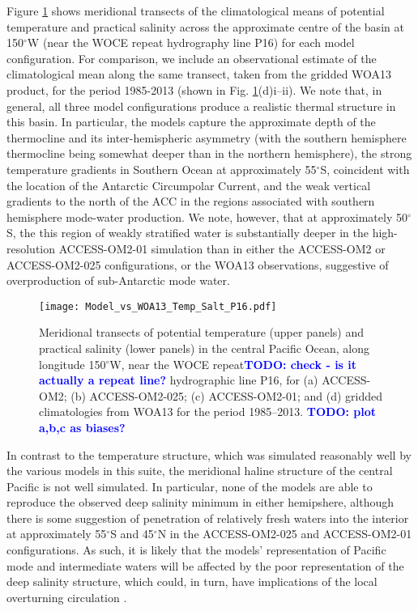 \documentclass[gmd, manuscript]{copernicus}
\newcommand{\TODO}[1]{\textcolor{blue}{\textsf{\textbf{TODO: #1}}}}
\begin{document}
Figure \ref{fig:Transect_Pacific} shows meridional transects of the climatological means of potential temperature and practical salinity across the approximate centre of the basin at 150$^{\circ}$W (near the WOCE repeat hydrography line P16) for each model configuration. For comparison, we include an observational estimate of the climatological mean along the same transect, taken from the gridded WOA13 product, for  the period 1985-2013 (shown in Fig. \ref{fig:Transect_Pacific}(d)i--ii). We note that, in general, all three model configurations produce a realistic thermal structure in this basin. In particular, the models capture the approximate depth of the thermocline and its inter-hemispheric asymmetry (with the southern hemisphere thermocline being somewhat deeper than in the northern hemisphere), the strong temperature gradients in Southern Ocean at approximately 55$^{\circ}$S, coincident with the location of the Antarctic Circumpolar Current, and the weak vertical gradients to the north of the ACC in the regions associated with southern hemisphere mode-water production. We note, however, that at approximately 50$^{\circ}$S, the this region of weakly stratified water is substantially deeper in the high-resolution ACCESS-OM2-01 simulation than in either the ACCESS-OM2 or ACCESS-OM2-025 configurations, or the WOA13 observations, suggestive of overproduction of sub-Antarctic mode water.        

\begin{figure}[t]
\texttt{[image: Model\_vs\_WOA13\_Temp\_Salt\_P16.pdf]}
\caption{Meridional transects of potential temperature (upper panels) and practical salinity (lower panels) in the central Pacific Ocean, along longitude 150$^{\circ}$W, near the WOCE repeat\TODO{check - is it actually a repeat line?} hydrographic line P16, for (a)  ACCESS-OM2; (b) ACCESS-OM2-025; (c) ACCESS-OM2-01;  and (d) gridded climatologies from WOA13 for the period 1985--2013. 
\TODO{plot a,b,c as biases?}
\label{fig:Transect_Pacific}}
\end{figure}

In contrast to the temperature structure, which was simulated reasonably well by the various models in this suite, the meridional haline structure of the central Pacific is not well simulated. In particular, none of the models are able to reproduce the observed deep salinity minimum in either hemipshere, although there is some suggestion of penetration of relatively fresh waters into the interior at approximately 55$^{\circ}$S and 45$^{\circ}$N in the ACCESS-OM2-025 and ACCESS-OM2-01 configurations. As such, it is likely that the models' representation of Pacific mode and intermediate waters will be affected by the poor representation of the deep salinity structure, which could, in turn, have implications of the local overturning circulation \citep{Thompson2016}.
\end{document}
